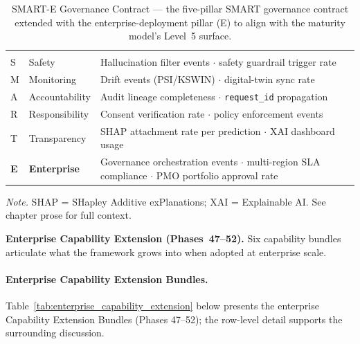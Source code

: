 {\tablestripes\tablefontsize
\begin{xltabular}{\textwidth}{@{} >{\centering\arraybackslash}p{0.6cm} >{\raggedright\arraybackslash}p{3.2cm} L @{}}
\caption[SMART-E Governance Contract]{SMART-E Governance Contract --- the five-pillar SMART governance contract extended with the enterprise-deployment pillar (E) to align with the maturity model's Level~5 surface.}\label{tab:smart_e_contract} \\
\toprule
\thead{} &  &  \\
\midrule
\endfirsthead
\toprule
\thead{} &  &  \\
\midrule
\endhead
\bottomrule
\endlastfoot
S & Safety & Hallucination filter events $\cdot$ safety guardrail trigger rate \\
M & Monitoring & Drift events (PSI/KSWIN) $\cdot$ digital-twin sync rate \\
A & Accountability & Audit lineage completeness $\cdot$ \texttt{request\_\allowbreak id} propagation \\
R & Responsibility & Consent verification rate $\cdot$ policy enforcement events \\
T & Transparency & SHAP attachment rate per prediction $\cdot$ XAI dashboard usage \\
\addlinespace
\textbf{E} & \textbf{Enterprise} & Governance orchestration events $\cdot$ multi-region SLA compliance $\cdot$ PMO portfolio approval rate \\
\end{xltabular}}
\vspace{0.3em}\noindent\textit{Note.} SHAP = SHapley Additive exPlanations; XAI = Explainable AI. See chapter prose for full context.

\noindent\textbf{Enterprise Capability Extension (Phases~47--52).} Six capability bundles articulate what the framework grows into when adopted at enterprise scale.

\paragraph{Enterprise Capability Extension Bundles.}


\noindent Table~\ref{tab:enterprise_capability_extension} below presents the enterprise Capability Extension Bundles (Phases 47--52); the row-level detail supports the surrounding discussion.

